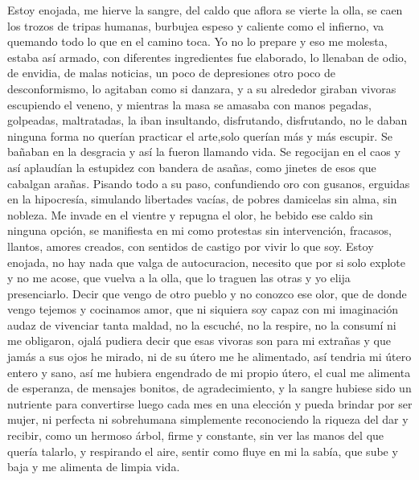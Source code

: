 \documentclass[12pt, a4paper, twoside]{book} %
\begin{document}
Estoy enojada, me hierve la sangre, del caldo que aflora se vierte la olla, se caen los trozos de tripas humanas, burbujea espeso y caliente como el infierno, va quemando todo lo que en el camino toca.
Yo no lo prepare y eso me molesta, estaba así armado, con diferentes ingredientes fue elaborado, lo llenaban de odio, de envidia, de malas noticias, un poco de depresiones otro poco de desconformismo, lo agitaban como si danzara, y a su alrededor giraban vivoras escupiendo el veneno, y mientras la masa se amasaba con manos pegadas, golpeadas, maltratadas, la iban insultando, disfrutando, disfrutando, no le daban ninguna forma no querían practicar el arte,solo querían más y más escupir.
Se bañaban en la desgracia y así la fueron llamando vida.
Se regocijan en el caos y así aplaudían la estupidez con bandera de asañas, como jinetes de esos que cabalgan arañas. Pisando todo a su paso, confundiendo oro con gusanos, erguidas en la hipocresía, simulando libertades vacías, de pobres damicelas sin alma, sin nobleza.
Me invade en el vientre y repugna el olor, he bebido ese caldo sin ninguna opción, se manifiesta en mi como protestas sin intervención, fracasos, llantos, amores creados, con sentidos de castigo por vivir lo que soy.
Estoy enojada, no hay nada que valga de autocuracion, necesito que por si solo explote y no me acose, que vuelva a la olla, que lo traguen las otras y yo elija presenciarlo.
Decir que vengo de otro pueblo y no conozco ese olor, que de donde vengo tejemos y cocinamos amor, que ni siquiera soy capaz con mi imaginación audaz de vivenciar tanta maldad, no la escuché, no la respire, no la consumí ni me obligaron, ojalá pudiera decir que esas vivoras son para mi extrañas y que jamás a sus ojos he mirado, ni de su útero me he alimentado, así tendria mi útero entero y sano, así me hubiera engendrado de mi propio útero, el cual me alimenta de esperanza, de mensajes bonitos, de agradecimiento, y la sangre hubiese sido un nutriente para convertirse luego cada mes en una elección y pueda brindar por ser mujer, ni perfecta ni sobrehumana simplemente reconociendo la riqueza del dar y recibir, como un hermoso árbol, firme y constante, sin ver las manos del que quería talarlo, y respirando el aire, sentir como fluye en mi la sabía, que sube y  baja y me alimenta de limpia vida.
\end{document}
